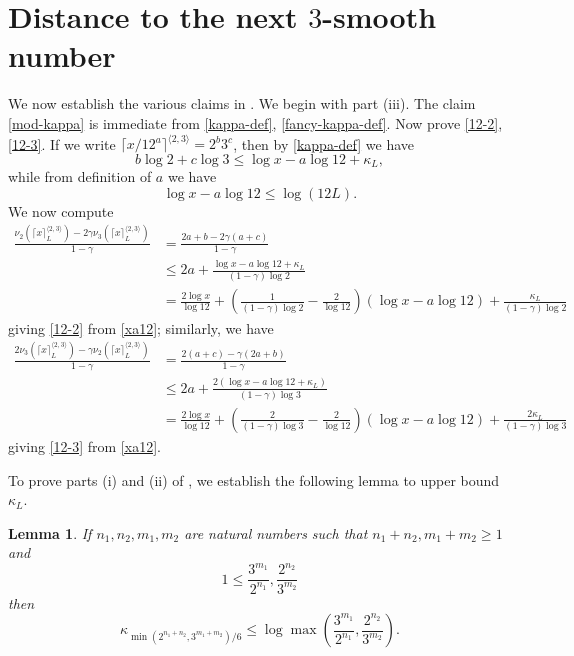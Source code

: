 \documentclass[12pt,a4paper,reqno]{amsart}
\numberwithin{equation}{section}
\theoremstyle{plain}
\newtheorem{lemma}[theorem]{Lemma}
\theoremstyle{definition}
\begin{document}
  
\appendix

\section{Distance to the next \texorpdfstring{$3$}{3}-smooth number}\label{power-sec}

We now establish the various claims in .  We begin with part (iii).  The claim \eqref{mod-kappa} is immediate from \eqref{kappa-def}, \eqref{fancy-kappa-def}.  Now prove \eqref{12-2}, \eqref{12-3}.  If we write $\lceil x/12^a \rceil^{\langle 2,3 \rangle} = 2^b 3^c$, then by \eqref{kappa-def} we have
$$ b \log 2 + c \log 3 \leq \log x - a \log 12 + \kappa_L,$$
while from definition of $a$ we have
\begin{equation}\label{xa12}
  \log x - a \log 12 \leq \log(12L).
\end{equation}
We now compute
\begin{align*}
  \frac{\nu_2(\lceil x \rceil^{\langle 2,3\rangle}_L) - 2 \gamma \nu_3(\lceil x \rceil^{\langle 2,3\rangle}_L)}{1-\gamma} 
  &= \frac{2a+b - 2\gamma(a+c)}{1-\gamma} \\
  &\leq 2a + \frac{\log x - a \log 12 + \kappa_L}{(1-\gamma) \log 2}  \\
  &= \frac{2\log x}{\log 12} + \left( \frac{1}{(1-\gamma)\log 2} - \frac{2}{\log 12}\right) \left(\log x - a \log 12\right)
  + \frac{\kappa_L}{(1-\gamma)\log 2} 
\end{align*}
giving \eqref{12-2} from \eqref{xa12}; similarly, we have
\begin{align*}
  \frac{2\nu_3(\lceil x \rceil^{\langle 2,3\rangle}_L) - \gamma \nu_2(\lceil x \rceil^{\langle 2,3\rangle}_L)}{1-\gamma} 
  &= \frac{2(a+c) - \gamma(2a+b)}{1-\gamma} \\
  &\leq 2a + \frac{2(\log x - a \log 12 + \kappa_L)}{(1-\gamma) \log 3}  \\
  &= \frac{2\log x}{\log 12} + \left( \frac{2}{(1-\gamma)\log 3} - \frac{2}{\log 12}\right) \left(\log x - a \log 12\right)
  + \frac{2\kappa_L}{(1-\gamma)\log 3} 
\end{align*}
giving \eqref{12-3} from \eqref{xa12}.

To prove parts (i) and (ii) of , we establish the following lemma to upper bound $\kappa_L$.

\begin{lemma}\label{lemcount-0}  If $n_1,n_2,m_1,m_2$ are natural numbers such that $n_1+n_2, m_1+m_2 \geq 1$ and
$$ 1 \leq \frac{3^{m_1}}{2^{n_1}}, \frac{2^{n_2}}{3^{m_2}}$$
then
$$ \kappa_{\min( 2^{n_1+n_2},3^{m_1+m_2})/6} \leq \log \max\left(\frac{3^{m_1}}{2^{n_1}}, \frac{2^{n_2}}{3^{m_2}}\right).$$
\end{lemma}
\end{document}
